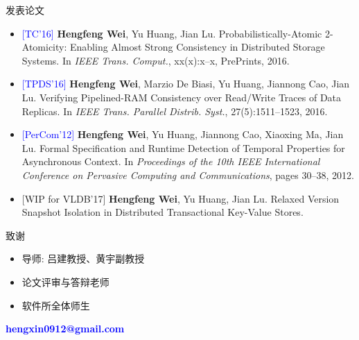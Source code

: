 \begin{frame}{发表论文}

  {\small
  \begin{itemize}
	\item \textcolor{blue}{[TC'16]} {\bf Hengfeng Wei}, Yu Huang, Jian Lu. 
	  Probabilistically-Atomic 2-Atomicity: Enabling Almost Strong Consistency in Distributed Storage Systems. 
	  In {\it IEEE Trans. Comput.}, xx(x):x--x, PrePrints, 2016.
	\item \textcolor{blue}{[TPDS'16]} {\bf Hengfeng Wei}, Marzio De Biasi, Yu Huang, Jiannong Cao, Jian Lu. 
	  Verifying Pipelined-RAM Consistency over Read/Write Traces of Data Replicas.
	  In {\it IEEE Trans. Parallel Distrib. Syst.}, 27(5):1511--1523, 2016.
	\item \textcolor{blue}{[PerCom'12]} {\bf Hengfeng Wei}, Yu Huang, Jiannong Cao, Xiaoxing Ma, Jian Lu. 
	  Formal Specification and Runtime Detection of Temporal Properties for Asynchronous Context. 
	  In {\it Proceedings of the 10th IEEE International Conference on Pervasive Computing and Communications},
	  pages 30--38, 2012.
	\item \textcolor{blue!50!gray}{[WIP for VLDB'17]} {\bf Hengfeng Wei}, Yu Huang, Jian Lu.
	  Relaxed Version Snapshot Isolation in Distributed Transactional Key-Value Stores. 
  \end{itemize}
  }
\end{frame}
\begin{frame}{致谢}
  \begin{itemize}
	\setlength{\itemsep}{15pt}
	\item 导师: 吕建教授、黄宇副教授
	\item 论文评审与答辩老师
	\item 软件所全体师生
  \end{itemize}
\end{frame}
\begin{frame}[noframenumbering]
  \vspace{-0.8cm}
  \begin{center}
    \textcolor{blue}{\bf \large hengxin0912@gmail.com}
  \end{center}
  \vspace{-0.5cm}
\end{frame}

